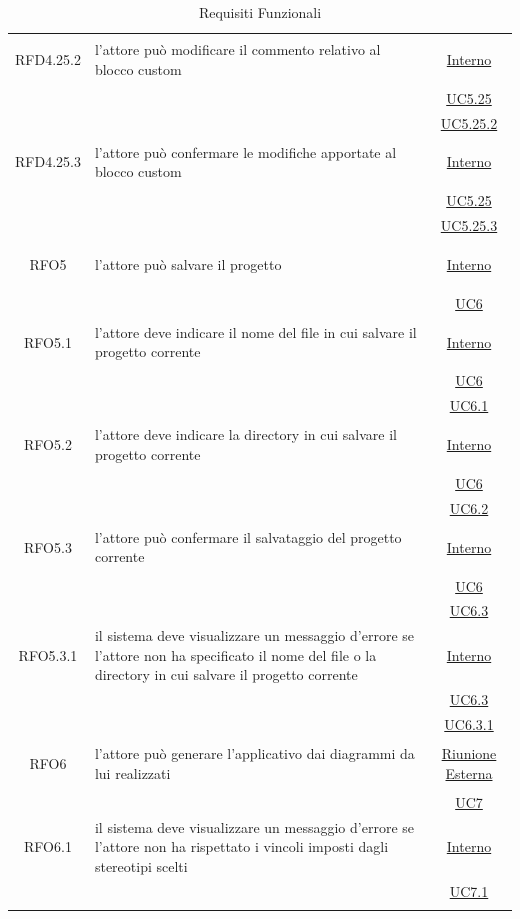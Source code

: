 \begin{longtable}{|c|>{\centering}m{7cm}|c|}
\hypertarget{RFD4.25.2}{RFD4.25.2} & l'attore può modificare il commento relativo al blocco custom &  \hyperlink{Interno}{Interno}\\
& &\hyperref[UC5.25]{UC5.25}\\
& &\hyperref[UC5.25.2]{UC5.25.2}\\ \hline

\hypertarget{RFD4.25.3}{RFD4.25.3} & l'attore può confermare le modifiche apportate al blocco custom &  \hyperlink{Interno}{Interno}\\
& &\hyperref[UC5.25]{UC5.25}\\
& &\hyperref[UC5.25.3]{UC5.25.3}\\ \hline

\hypertarget{RFO5}{RFO5} & l'attore può salvare il progetto &  \hyperlink{Interno}{Interno}\\
& & \hyperref[UC6]{UC6}\\ \hline

\hypertarget{RFO5.1}{RFO5.1} & l'attore deve indicare il nome del file in cui salvare il progetto corrente&  \hyperlink{Interno}{Interno}\\
& & \hyperref[UC6]{UC6}\\ 
& & \hyperref[UC6.1]{UC6.1}\\ \hline

\hypertarget{RFO5.2}{RFO5.2} & l'attore deve indicare la directory in cui salvare il progetto corrente&  \hyperlink{Interno}{Interno}\\
& & \hyperref[UC6]{UC6}\\ 
& & \hyperref[UC6.2]{UC6.2}\\ \hline

\hypertarget{RFO5.3}{RFO5.3} & l'attore può confermare il salvataggio del progetto corrente &  \hyperlink{Interno}{Interno}\\
& & \hyperref[UC6]{UC6}\\ 
& & \hyperref[UC6.3]{UC6.3}\\ \hline

\hypertarget{RFO5.3.1}{RFO5.3.1} & il sistema deve visualizzare un messaggio d'errore se l'attore non ha specificato il nome del file o la directory in cui salvare il progetto corrente &  \hyperlink{Interno}{Interno}\\
& & \hyperref[UC6.3]{UC6.3}\\ 
& & \hyperref[UC6.3.1]{UC6.3.1}\\ \hline

\hypertarget{RFO6}{RFO6} & l'attore può generare l'applicativo dai diagrammi da lui realizzati & \hyperlink{Riunione Esterna}{Riunione Esterna}\\
& & \hyperref[UC7]{UC7}\\ \hline

\hypertarget{RFO6.1}{RFO6.1} & il sistema deve visualizzare un messaggio d'errore se l'attore non ha rispettato i vincoli imposti dagli stereotipi scelti& \hyperlink{Interno}{Interno}\\
& & \hyperref[UC7.1]{UC7.1}\\ \hline

\caption[Requisiti Funzionali]{Requisiti Funzionali}
\label{tabella:req0}
\end{longtable}
\clearpage

